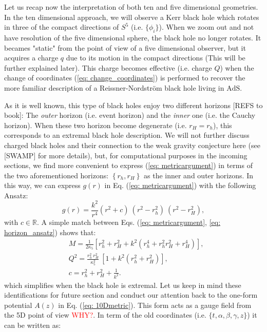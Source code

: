 Let us recap now the interpretation of both ten and five dimensional geometries. In the ten dimensional approach, we will observe a Kerr black hole which rotates in three of the compact directions of $S^{5}$ (i.e. $\{\phi_{i}\}$). When we zoom out and not have resolution of the five dimensional sphere, the black hole no longer rotates. It becames "static" from the point of view of a five dimensional observer, but it acquires a charge $q$ due to its motion in the compact directions (This will be further explained later). This charge becomes effective (i.e. charge $Q$) when the change of coordinates (\ref{eq: change_coordinates}) is performed to recover the more familiar description of a Reissner-Nordström black hole living in $\text{AdS}$.

As it is well known, this type of black holes enjoy two different horizons [REFS to book]: The \textit{outer} horizon (i.e. event horizon) and the \textit{inner} one (i.e. the Cauchy horizon). When these two horizon become degenerate (i.e. $r_{H} = r_{h}$), this corresponds to an extremal black hole description. We will not further discuss charged black holes and their connection to the weak gravity conjecture here (see [SWAMP] for more details), but, for computational purposes in the incoming sections, we find more convenient to express (\ref{eq: metricargument}) in terms of the two aforementioned horizons: $\left\{r_{h}, r_{H}\right\}$ as the inner and outer horizons. In this way, we can express $g(r)$ in Eq. (\ref{eq: metricargument}) with the following Ansatz:
\begin{equation}\label{eq: horizon_ansatz}
    g(r) = \frac{k^{2}}{r^{4}}\left(r^{2} + c\right)\:\left(r^{2} -r_{h}^{2}\right)\:\left(r^{2} - r_{H}^{2}\right),
\end{equation}
with $c \in \mathbb{R}$. A simple match between Eqs. (\ref{eq: metricargument}, \ref{eq: horizon_ansatz}) shows that:
\begin{equation}\label{eq: MQhorizons}
    \begin{split}
        &M= \frac{1}{2 \kappa_{5}}\left[r_h^{2} + r_H^{2} +k^{2} \left( r_{h}^{4}  + r_h^{2} r_H^{2}  + r_H^4 \right)\right],  \\
    &Q^2 =\frac{r_{h}^{2}\:r_{H}^{2}}{\kappa_5^2} \:\left[1 + k^{2}\left(r^{2}_{h}+ r_{H}^{2}\right)\right],\\
    &c = r_{h}^{2} + r_{H}^{2} + \tfrac{1}{k^{2}}.
    \end{split}
\end{equation}
which simplifies when the black hole is extremal. Let us keep in mind these identifications for future section and conduct our attention back to the one-form potential $A(z)$ in Eq. (\ref{eq: 10Dmetric}). This form acts as a gauge field from the 5D point of view \textcolor{red}{WHY?}. In term of the old coordinates (i.e. $\{t, \alpha, \beta, \gamma, z\}$) it can be written as:
